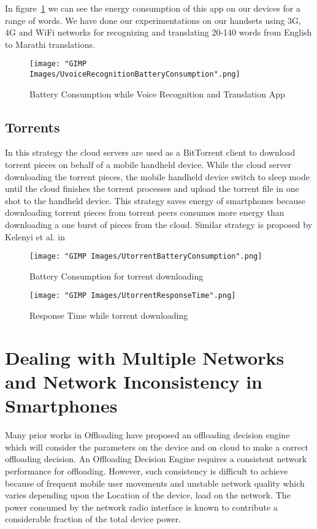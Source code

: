 \documentclass{report}
\begin{document}
In figure~\ref{fig:UvoiceRecognitionBatteryConsumption} we can see the energy consumption of this app on our devices for a range of words. 
We have done our experimentations on our handsets using 3G, 4G and WiFi networks for recognizing and translating 20-140 words from English to Marathi translations. 


\begin{figure}[h]
  \centering
  \texttt{[image: "GIMP Images/UvoiceRecognitionBatteryConsumption".png]}
  \caption{Battery Consumption while Voice Recognition and Translation App}
  \label{fig:UvoiceRecognitionBatteryConsumption}
\end{figure}

\section{Torrents}
In this strategy the cloud servers are used as a BitTorrent client to download torrent pieces on behalf of a mobile handheld device.
While the cloud server downloading the torrent pieces, the mobile handheld device switch to sleep mode until the cloud finishes the torrent processes and upload the torrent file in one shot to the handheld device. This strategy saves energy of smartphones
because downloading torrent pieces from torrent peers consumes more energy than downloading a one
burst of pieces from the cloud. Similar strategy is proposed by Kelenyi et al. in \cite{kelenyi2010cloudtorrent}


\begin{figure}[h!]
  \centering
  \texttt{[image: "GIMP Images/UtorrentBatteryConsumption".png]}
  \caption{Battery Consumption for torrent downloading}
  \label{fig:UtorrentBatteryConsumption}
\end{figure}

\begin{figure}[h!]
  \centering
  \texttt{[image: "GIMP Images/UtorrentResponseTime".png]}
  \caption{Response Time while torrent downloading}
  \label{fig:UtorrentResponseTime}
\end{figure}


\chapter{Dealing with Multiple Networks and Network Inconsistency in Smartphones} %
\label{chap:NetworkInconsistency}

Many prior works in Offloading have proposed an offloading decision engine which will consider the parameters on the device and on cloud to make a correct offloading decision. An Offloading Decision Engine requires a consistent network performance for offloading. However, such consistency is difficult to achieve because of frequent mobile user movements and unstable network quality which varies depending upon the Location of the device, load on the network. The power consumed by the network radio interface is known to contribute a considerable fraction of the total device power. 
\end{document}
